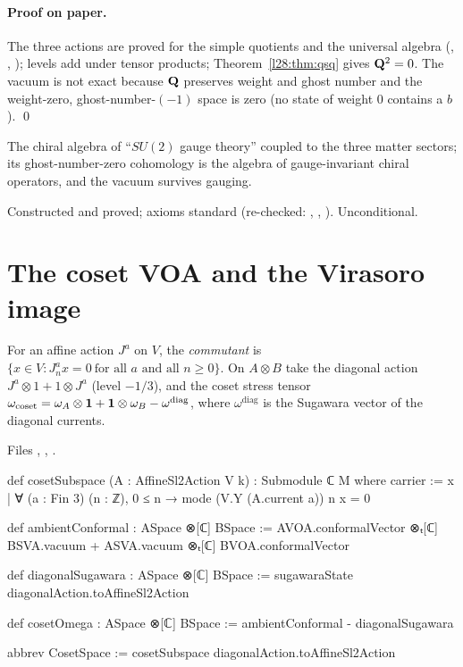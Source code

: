 \paragraph{Proof on paper.} The three actions are proved for the simple quotients and the universal algebra
(, , ); levels add under tensor products; Theorem~\ref{l28:thm:qsq} gives $\mathbf Q^2=0$.
The vacuum is not exact because $\mathbf Q$ preserves weight and ghost number and the weight-zero, ghost-number-$(-1)$ space is
zero (no state of weight $0$ contains a $b$). \qed

\begin{physics}
The chiral algebra of ``$SU(2)$ gauge theory'' coupled to the three matter sectors; its ghost-number-zero cohomology is the
algebra of gauge-invariant chiral operators, and the vacuum survives gauging.
\end{physics}

\begin{status}
Constructed and proved; axioms standard (re-checked: , ,
). Unconditional.
\end{status}

\section{The coset VOA and the Virasoro image}\label{l28:sec:coset}

\begin{definition}\label{l28:def:coset}
For an affine action $J^a$ on $V$, the \emph{commutant} is $\{x\in V: J^a_nx=0\ \text{for all }a\text{ and all }n\ge0\}$. On
$A\otimes B$ take the diagonal action $J^a\otimes1+1\otimes J^a$ (level $-1/3$), and the coset stress tensor
$\omega_{\mathrm{coset}}=\omega_A\otimes\mathbf 1+\mathbf 1\otimes\omega_B-\omega^{\mathrm{diag}}$, where $\omega^{\mathrm{diag}}$ is
the Sugawara vector of the diagonal currents.
\end{definition}

\noindent Files , ,
.
\begin{leancode}
def cosetSubspace (A : AffineSl2Action V k) : Submodule ℂ M where
  carrier := {x | ∀ (a : Fin 3) (n : ℤ), 0 ≤ n → mode (V.Y (A.current a)) n x = 0}

def ambientConformal : ASpace ⊗[ℂ] BSpace :=
  AVOA.conformalVector ⊗ₜ[ℂ] BSVA.vacuum + ASVA.vacuum ⊗ₜ[ℂ] BVOA.conformalVector

def diagonalSugawara : ASpace ⊗[ℂ] BSpace := sugawaraState diagonalAction.toAffineSl2Action

def cosetOmega : ASpace ⊗[ℂ] BSpace := ambientConformal - diagonalSugawara

abbrev CosetSpace := cosetSubspace diagonalAction.toAffineSl2Action
\end{leancode}

